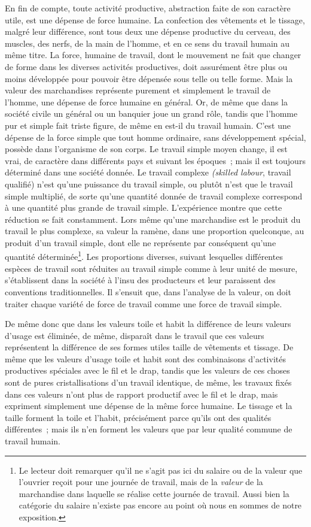 \documentclass[french,twoside]{book} %
\begin{document}
En fin de compte, toute activité productive, abstraction faite de son caractère utile, est une dépense de force humaine. La confection des vêtements et le tissage, malgré leur différence, sont tous deux une dépense productive du cerveau, des muscles, des nerfs, de la main de l’homme, et en ce sens du travail humain au même titre. La force, humaine de travail, dont le mouvement ne fait que changer de forme dans les diverses activités productives, doit assurément être plus ou moins développée pour pouvoir être dépensée sous telle ou telle forme. Mais la valeur des marchandises représente purement et simplement le travail de l’homme, une dépense de force humaine en général. Or, de même que dans la société civile un général ou un banquier joue un grand rôle, tandis que l’homme pur et simple fait triste figure, de même en est-il du travail humain. C’est une dépense de la force simple que tout homme ordinaire, sans développement spécial, possède dans l’organisme de son corps. Le travail simple moyen change, il est vrai, de caractère dans différents pays et suivant les époques ; mais il est toujours déterminé dans une société donnée. Le travail complexe \emph{(skilled labour}, travail qualifié) n’est qu’une puissance du travail simple, ou plutôt n’est que le travail simple multiplié, de sorte qu’une quantité donnée de travail complexe correspond à une quantité plus grande de travail simple. L’expérience montre que cette réduction se fait constamment. Lors même qu’une marchandise est le produit du travail le plus complexe, sa valeur la ramène, dans une proportion quelconque, au produit d’un travail simple, dont elle ne représente par conséquent qu’une quantité déterminée\footnote{Le lecteur doit remarquer qu’il ne s’agit pas ici du salaire ou de la valeur que l’ouvrier reçoit pour une journée de travail, mais de la \emph{valeur} de la marchandise dans laquelle se réalise cette journée de travail. Aussi bien la catégorie du salaire n’existe pas encore au point où nous en sommes de notre exposition.}. Les proportions diverses, suivant lesquelles différentes espèces de travail sont réduites au travail simple comme à leur unité de mesure, s’établissent dans la société à l’insu des producteurs et leur paraissent des conventions traditionnelles. Il s’ensuit que, dans l’analyse de la valeur, on doit traiter chaque variété de force de travail comme une force de travail simple.\par
De même donc que dans les valeurs toile et habit la différence de leurs valeurs d’usage est éliminée, de même, disparaît dans le travail que ces valeurs représentent la différence de ses formes utiles taille de vêtements et tissage. De même que les valeurs d’usage toile et habit sont des combinaisons d’activités productives spéciales avec le fil et le drap, tandis que les valeurs de ces choses sont de pures cristallisations d’un travail identique, de même, les travaux fixés dans ces valeurs n’ont plus de rapport productif avec le fil et le drap, mais expriment simplement une dépense de la même force humaine. Le tissage et la taille forment la toile et l’habit, précisément parce qu’ils ont des qualités différentes ; mais ils n’en forment les valeurs que par leur qualité commune de travail humain.\par
\end{document}
